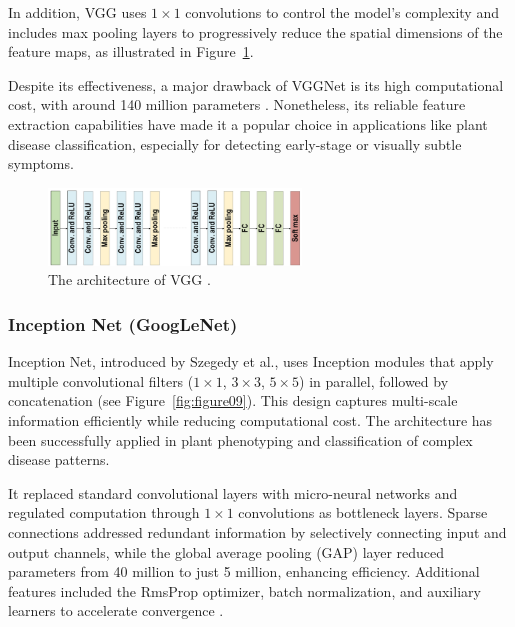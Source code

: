 In addition, VGG uses $1 \times 1$ convolutions to control the model’s complexity and includes max pooling layers to progressively reduce the spatial dimensions of the feature maps, as illustrated in Figure~\ref{fig:figure08}.

Despite its effectiveness, a major drawback of VGGNet is its high computational cost, with around 140 million parameters \parencite{alzubaidi2021review}. Nonetheless, its reliable feature extraction capabilities have made it a popular choice in applications like plant disease classification, especially for detecting early-stage or visually subtle symptoms.


\begin{figure}[H] %
    \centering
    \includegraphics[width=0.6\textwidth]{chapters/chapter1/images/Figure08.png}
    \caption{The architecture of VGG \parencite{alzubaidi2021review}.}
    \label{fig:figure08}
\end{figure}

\subsubsection{Inception Net (GoogLeNet)}
Inception Net, introduced by Szegedy et al., uses Inception modules that apply multiple convolutional filters ($1 \times 1$, $3 \times 3$, $5 \times 5$) in parallel, followed by concatenation (see Figure~\ref{fig:figure09}). This design captures multi-scale information efficiently while reducing computational cost. The architecture has been successfully applied in plant phenotyping and classification of complex disease patterns.

It replaced standard convolutional layers with micro-neural networks and regulated computation through $1 \times 1$ convolutions as bottleneck layers. Sparse connections addressed redundant information by selectively connecting input and output channels, while the global average pooling (GAP) layer reduced parameters from 40 million to just 5 million, enhancing efficiency. Additional features included the RmsProp optimizer, batch normalization, and auxiliary learners to accelerate convergence \parencite{alzubaidi2021review}.



